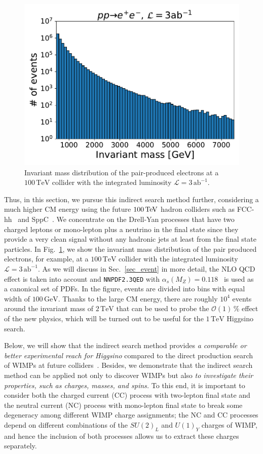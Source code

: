 \documentclass[12pt,twoside,book]{article}
\begin{document}
\begin{figure}[t]
  \centering
  \includegraphics[width=0.5\hsize]{histMee.pdf}
  \caption{
    Invariant mass distribution of the pair-produced electrons at a $100\,\mathrm{TeV}$ collider with the integrated luminosity $\mathcal{L} = 3\,\mathrm{ab}^{-1}$.
  }
  \label{fig:histMee}
\end{figure}

Thus, in this section, we pursue this indirect search method further, considering a much higher CM energy using the future $100\,{\rm TeV}$ hadron colliders such as FCC-hh~\cite{Mangano:2016jyj, Contino:2016spe, Golling:2016gvc, Benedikt:2651300} and SppC~\cite{CEPC-SPPCStudyGroup:2015csa, CEPC-SPPCStudyGroup:2015esa}.
We concentrate on the Drell-Yan processes that have two charged leptons or mono-lepton plus a neutrino in the final state since they provide a very clean signal without any hadronic jets at least from the final state particles.
In Fig.~\ref{fig:histMee}, we show the invariant mass distribution of the pair produced electrons, for example, at a $100\,\mathrm{TeV}$ collider with the integrated luminosity $\mathcal{L} = 3\,\mathrm{ab}^{-1}$.
As we will discuss in Sec.~\ref{sec_event} in more detail, the NLO QCD effect is taken into account and \texttt{NNPDF2.3QED} with $\alpha_s (M_Z) = 0.118$~\cite{Ball:2013hta} is used as a canonical set of PDFs.
In the figure, events are divided into bins with equal width of $100\,\mathrm{GeV}$.
Thanks to the large CM energy, there are roughly $10^4$ events around the invariant mass of $2\,\mathrm{TeV}$ that can be used to probe the $\mathcal{O}(1)\,\%$ effect of the new physics, which will be turned out to be useful for the $1\,\mathrm{TeV}$ Higgsino search.

Below, we will show that the indirect search method provides \textit{a comparable or better experimental reach for Higgsino} compared to the direct production search of WIMPs at future colliders~\cite{Low:2014cba, Cirelli:2014dsa, Han:2018wus, Mahbubani:2017gjh}.
Besides, we demonstrate that the indirect search method can be applied not only to discover WIMPs but also \textit{to investigate their properties, such as charges, masses, and spins.}
To this end, it is important to consider both the charged current (CC) process with two-lepton final state and the neutral current (NC) process with mono-lepton final state to break some degeneracy among different WIMP charge assignments; the NC and CC processes depend on different combinations of the $SU(2)_L$ and $U(1)_Y$ charges of WIMP, and hence the inclusion of both processes allows us to extract these charges separately.
\end{document}
